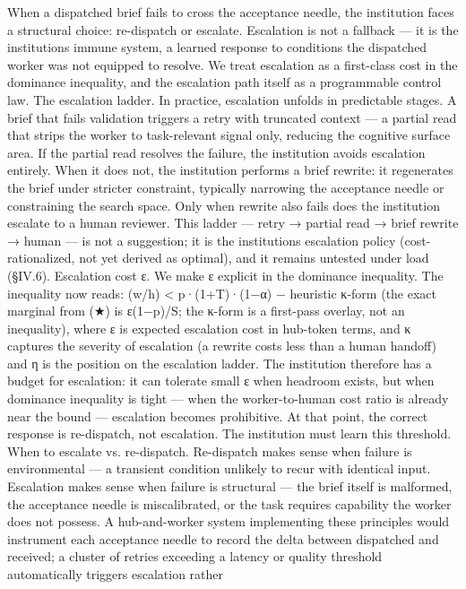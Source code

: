 \documentclass[
]{article}
\begin{document}
When a dispatched brief fails to cross the acceptance needle, the
institution faces a structural choice: re-dispatch or escalate.
Escalation is not a fallback --- it is the institution\textquotesingle s
immune system, a learned response to conditions the dispatched worker
was not equipped to resolve. We treat escalation as a first-class cost
in the dominance inequality, and the escalation path itself as a
programmable control law. The escalation ladder. In practice, escalation
unfolds in predictable stages. A brief that fails validation triggers a
retry with truncated context --- a partial read that strips the worker
to task-relevant signal only, reducing the cognitive surface area. If
the partial read resolves the failure, the institution avoids escalation
entirely. When it does not, the institution performs a brief rewrite: it
regenerates the brief under stricter constraint, typically narrowing the
acceptance needle or constraining the search space. Only when rewrite
also fails does the institution escalate to a human reviewer. This
ladder --- retry → partial read → brief rewrite → human --- is not a
suggestion; it is the institution\textquotesingle s escalation policy
(cost-rationalized, not yet derived as optimal), and it remains untested
under load (§IV.6). Escalation cost ε. We make ε explicit in the
dominance inequality. The inequality now reads: (w/h) \textless{}
p·(1+T)·(1−α) − heuristic κ-form (the exact marginal from (★) is
ε(1−p)/S; the κ-form is a first-pass overlay, not an inequality), where
ε is expected escalation cost in hub-token terms, and κ captures the
severity of escalation (a rewrite costs less than a human handoff) and η
is the position on the escalation ladder. The institution therefore has
a budget for escalation: it can tolerate small ε when headroom exists,
but when dominance inequality is tight --- when the worker-to-human cost
ratio is already near the bound --- escalation becomes prohibitive. At
that point, the correct response is re-dispatch, not escalation. The
institution must learn this threshold. When to escalate vs. re-dispatch.
Re-dispatch makes sense when failure is environmental --- a transient
condition unlikely to recur with identical input. Escalation makes sense
when failure is structural --- the brief itself is malformed, the
acceptance needle is miscalibrated, or the task requires capability the
worker does not possess. A hub-and-worker system implementing these
principles would instrument each acceptance needle to record the delta
between dispatched and received; a cluster of retries exceeding a
latency or quality threshold automatically triggers escalation rather
\end{document}
